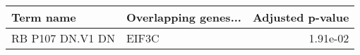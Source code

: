 \begin{tabular}{llr}
\toprule
       Term name & Overlapping genes... &  Adjusted p-value \\
\midrule
RB P107 DN.V1 DN &                EIF3C &          1.91e-02 \\
\bottomrule
\end{tabular}

